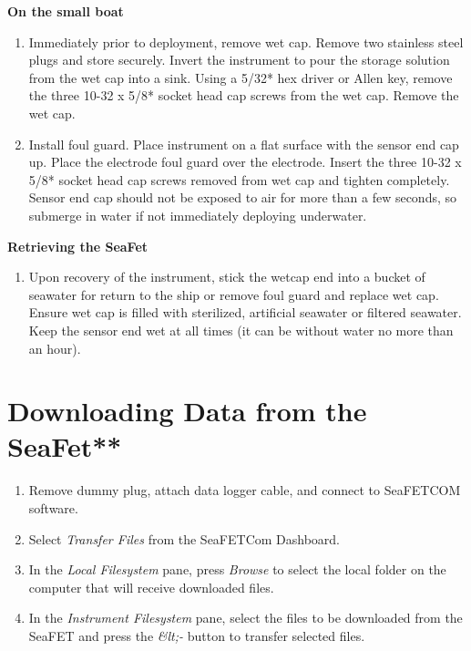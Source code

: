 \documentclass[
]{book}
\providecommand{\tightlist}{%
  \setlength{\itemsep}{0pt}\setlength{\parskip}{0pt}}
\begin{document}
\textbf{On the small boat}

\begin{enumerate}
\def\labelenumi{\arabic{enumi}.}
\tightlist
\item
  Immediately prior to deployment, remove wet cap. Remove two stainless steel plugs and store securely. Invert the instrument to pour the storage solution from the wet cap into a sink. Using a 5/32* hex driver or Allen key, remove the three 10-32 x 5/8* socket head cap screws from the wet cap. Remove the wet cap.
\item
  Install foul guard. Place instrument on a flat surface with the sensor end cap up. Place the electrode foul guard over the electrode. Insert the three 10-32 x 5/8* socket head cap screws removed from wet cap and tighten completely. Sensor end cap should not be exposed to air for more than a few seconds, so submerge in water if not immediately deploying underwater.
\end{enumerate}

\textbf{Retrieving the SeaFet}

\begin{enumerate}
\def\labelenumi{\arabic{enumi}.}
\tightlist
\item
  Upon recovery of the instrument, stick the wetcap end into a bucket of seawater for return to the ship or remove foul guard and replace wet cap. Ensure wet cap is filled with sterilized, artificial seawater or filtered seawater. Keep the sensor end wet at all times (it can be without water no more than an hour).
\end{enumerate}

\hypertarget{downloading-data-from-the-seafet}{%
\section{Downloading Data from the SeaFet**}\label{downloading-data-from-the-seafet}}

\begin{enumerate}
\def\labelenumi{\arabic{enumi}.}
\setcounter{enumi}{1}
\item
  Remove dummy plug, attach data logger cable, and connect to SeaFETCOM software.
\item
  Select \emph{Transfer Files} from the SeaFETCom Dashboard.
\item
  In the \emph{Local Filesystem} pane, press \emph{Browse} to select the local folder on the computer that will receive downloaded files.
\item
  In the \emph{Instrument Filesystem} pane, select the files to be downloaded from the SeaFET and press the \emph{\&lt;-} button to transfer selected files.
\end{enumerate}
\end{document}

